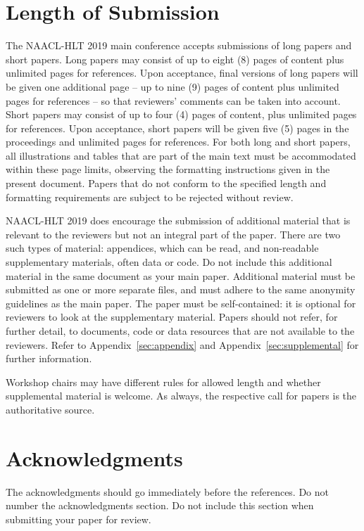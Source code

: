 \documentclass[11pt,a4paper]{article}
\begin{document}
\section{Length of Submission}
\label{sec:length}

The NAACL-HLT 2019 main conference accepts submissions of long papers and
short papers.
 Long papers may consist of up to eight (8) pages of
content plus unlimited pages for references. Upon acceptance, final
versions of long papers will be given one additional page -- up to nine (9)
pages of content plus unlimited pages for references -- so that reviewers' comments
can be taken into account. Short papers may consist of up to four (4)
pages of content, plus unlimited pages for references. Upon
acceptance, short papers will be given five (5) pages in the
proceedings and unlimited pages for references. 
For both long and short papers, all illustrations and tables that are part
of the main text must be accommodated within these page limits, observing
the formatting instructions given in the present document. Papers that do not conform to the specified length and formatting requirements are subject to be rejected without review.

NAACL-HLT 2019 does encourage the submission of additional material that is relevant to the reviewers but not an integral part of the paper. There are two such types of material: appendices, which can be read, and non-readable supplementary materials, often data or code.  Do not include this additional material in the same document as your main paper. Additional material must be submitted as one or more separate files, and must adhere to the same anonymity guidelines as the main paper. The paper must be self-contained: it is optional for reviewers to look at the supplementary material. Papers should not refer, for further detail, to documents, code or data resources that are not available to the reviewers. Refer to Appendix~\ref{sec:appendix} and Appendix~\ref{sec:supplemental} for further information. 

Workshop chairs may have different rules for allowed length and
whether supplemental material is welcome. As always, the respective
call for papers is the authoritative source.

\section*{Acknowledgments}

The acknowledgments should go immediately before the references.  Do
not number the acknowledgments section. Do not include this section
when submitting your paper for review. \\
\end{document}
